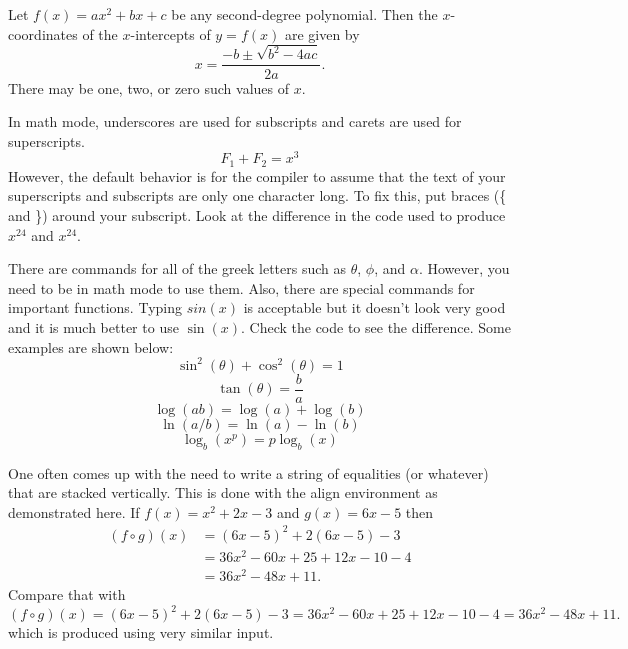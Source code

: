 \documentclass{article}
\begin{document}
Let $f(x) = ax^2 + bx + c$ be any second-degree polynomial.  Then the $x$-coordinates of the $x$-intercepts of $y=f(x)$ are given by 
\[x = \frac{-b \pm \sqrt{b^2 - 4ac}}{2a}.\]
There may be one, two, or zero such values of $x$.

In math mode, underscores are used for subscripts and carets are used for superscripts.  \[F_1 + F_2 = x^3\]  However, the default behavior is for the compiler to assume that the text of your superscripts and subscripts are only one character long.  To fix this, put braces (\{ and \}) around your subscript.  Look at the difference in the code used to produce $x^24$ and $x^{24}$.

There are commands for all of the greek letters such as $\theta$, $\phi$, and $\alpha$.  However, you need to be in math mode to use them.  Also, there are special commands for important functions.  Typing $sin(x)$ is acceptable but it doesn't look very good and it is much better to use $\sin(x)$.  Check the code to see the difference.  Some examples are shown below:
\[\sin^2(\theta) + \cos^2(\theta) = 1\]
\[\tan(\theta) = \frac{b}{a}\]
\[\log(ab) = \log(a) + \log(b)\]
\[\ln(a/b) = \ln(a) - \ln(b)\]
\[\log_b(x^p) = p \log_b(x)\]

One often comes up with the need to write a string of equalities (or whatever) that are stacked vertically.  This is done with the align environment as demonstrated here.  If $f(x) = x^2 + 2x - 3$ and $g(x) = 6x-5$ then
\begin{align*}
(f \circ g)(x) &= (6x-5)^2 + 2(6x-5) - 3 \\
&= 36x^2 - 60x + 25 + 12x - 10 - 4 \\
&= 36x^2 - 48x + 11.
\end{align*}
Compare that with 
\[
(f \circ g)(x) = (6x-5)^2 + 2(6x-5) - 3
= 36x^2 - 60x + 25 + 12x - 10 - 4
= 36x^2 - 48x + 11.
\]
which is produced using very similar input.
\end{document}
